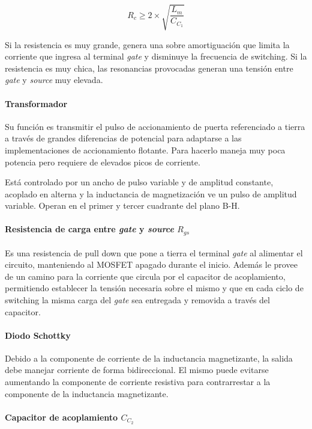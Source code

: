 $$ R_c\geq2\times\sqrt{\frac{L_m}{C_{C_1}}} $$

Si la resistencia es muy grande, genera una sobre amortiguación que limita la corriente que ingresa al terminal \textit{gate} y disminuye la frecuencia de switching. 
Si la resistencia es muy chica, las resonancias provocadas generan una tensión entre \textit{gate} y \textit{source} muy elevada.

\paragraph{Transformador}

Su función es transmitir el pulso de accionamiento de puerta referenciado a tierra a través de grandes diferencias de potencial para adaptarse a las implementaciones de accionamiento flotante. 
Para hacerlo maneja muy poca potencia pero requiere de elevados picos de corriente. 

Está controlado por un ancho de pulso variable y de amplitud constante,
acoplado en alterna y la inductancia de magnetización ve un pulso de amplitud variable.
Operan en el primer y tercer cuadrante del plano B-H.

\paragraph{Resistencia de carga entre \textit{gate} y \textit{source} $R_{gs}$}

Es una resistencia de pull down que pone a tierra el terminal \textit{gate} al alimentar el circuito, manteniendo al MOSFET apagado durante el inicio. 
Además le provee de un camino para la corriente que circula por el capacitor de acoplamiento, 
permitiendo establecer la tensión necesaria sobre el mismo y que en cada ciclo de switching 
la misma carga del \textit{gate} sea entregada y removida a través del capacitor. 

\paragraph{Diodo Schottky}

Debido a la componente de corriente de la inductancia magnetizante, la salida debe manejar corriente de forma bidireccional. 
El mismo puede evitarse aumentando la componente de corriente resistiva para contrarrestar a la componente de la inductancia magnetizante. 

\paragraph{Capacitor de acoplamiento $C_{C_2}$}

